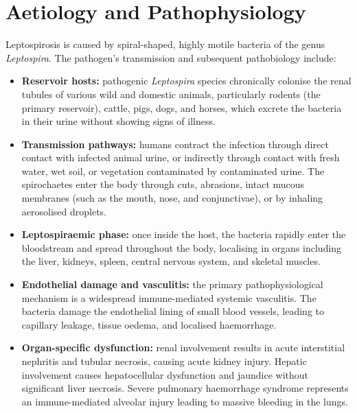 \section*{Aetiology and Pathophysiology}
Leptospirosis is caused by spiral-shaped, highly motile bacteria of the genus \textit{Leptospira}. The pathogen's transmission and subsequent pathobiology include:
\begin{itemize}
    \item \textbf{Reservoir hosts:} pathogenic \textit{Leptospira} species chronically colonise the renal tubules of various wild and domestic animals, particularly rodents (the primary reservoir), cattle, pigs, dogs, and horses, which excrete the bacteria in their urine without showing signs of illness.
    \item \textbf{Transmission pathways:} humans contract the infection through direct contact with infected animal urine, or indirectly through contact with fresh water, wet soil, or vegetation contaminated by contaminated urine. The spirochaetes enter the body through cuts, abrasions, intact mucous membranes (such as the mouth, nose, and conjunctivae), or by inhaling aerosolised droplets.
    \item \textbf{Leptospiraemic phase:} once inside the host, the bacteria rapidly enter the bloodstream and spread throughout the body, localising in organs including the liver, kidneys, spleen, central nervous system, and skeletal muscles.
    \item \textbf{Endothelial damage and vasculitis:} the primary pathophysiological mechanism is a widespread immune-mediated systemic vasculitis. The bacteria damage the endothelial lining of small blood vessels, leading to capillary leakage, tissue oedema, and localised haemorrhage.
    \item \textbf{Organ-specific dysfunction:} renal involvement results in acute interstitial nephritis and tubular necrosis, causing acute kidney injury. Hepatic involvement causes hepatocellular dysfunction and jaundice without significant liver necrosis. Severe pulmonary haemorrhage syndrome represents an immune-mediated alveolar injury leading to massive bleeding in the lungs.
\end{itemize}

